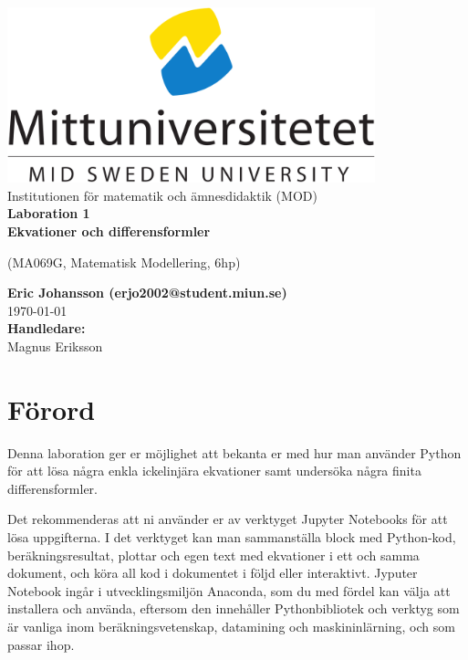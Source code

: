 \documentclass[a4paper]{article}
\makeatletter
\newcommand{\getauthor}{Eric Johansson (erjo2002@student.miun.se)} %
\newcommand{\gettitle}{Laboration 1 \\ Ekvationer och differensformler} %
\newcommand{\getcourse}{(MA069G, Matematisk Modellering, 6hp)} %
\newcommand{\getsupervisor}{Magnus Eriksson}
\makeatother
\begin{document}
\begin{titlepage}
  \begin{center}
    \vspace*{1cm}
    \includegraphics[width=0.8\textwidth]{msu.png}\\[0.5cm]
    \Large
    Institutionen för matematik och ämnesdidaktik (MOD)\\[1cm]
    \Huge
    \textbf{\gettitle}

    \large
    \getcourse{}

    \vspace{1cm}

    \Large
    \textbf{\getauthor}\\
    \vfill
    \vspace{0.8cm}
    \small
    \today \\
    \Large
    \textbf{Handledare:}\\
    \getsupervisor{}
  \end{center}
\end{titlepage}

\tableofcontents
\newpage

\section{Förord}
Denna laboration ger er möjlighet att bekanta er med hur man använder
Python för att lösa några enkla ickelinjära ekvationer samt undersöka
några finita differensformler.

Det rekommenderas att ni använder er av verktyget Jupyter Notebooks för att lösa 
uppgifterna. I det verktyget kan man sammanställa block med Python-kod, beräkningsresultat, 
plottar och egen text med ekvationer i ett och samma dokument, och köra all kod i dokumentet 
i följd eller interaktivt. Jyputer Notebook ingår i utvecklingsmiljön Anaconda, som du med 
fördel kan välja att installera och använda, eftersom den innehåller Pythonbibliotek och 
verktyg som är vanliga inom beräkningsvetenskap, datamining och maskininlärning, och som passar ihop.
\end{document}
